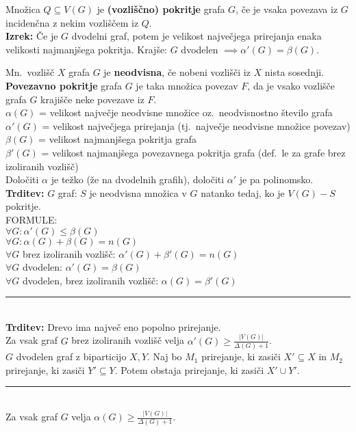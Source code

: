\documentclass[a4paper,10pt]{article}
\theoremstyle{definition}
\let\oldtextbf\textbf
\renewcommand{\textbf}[1]{\oldtextbf{\boldmath #1}}
\newcommand{\rlsep}{\rule{0.5 \textwidth}{.1pt}}
\begin{document}
Množica $Q \subseteq V(G)$ je \textbf{(vozliščno) pokritje} grafa $G$, če je vsaka povezava iz $G$ incidenčna z nekim vozliščem iz $Q$.\\
\textbf{Izrek:} Če je $G$ dvodelni graf, potem je velikost največjega prirejanja enaka velikosti najmanjšega pokritja. Krajše: $G$ dvodelen $\implies \alpha'(G) = \beta(G)$.

Mn.\ vozlišč $X$ grafa $G$ je \textbf{neodvisna}, če nobeni vozlišči iz $X$ nista sosednji.\\
\textbf{Povezavno pokritje} grafa $G$ je taka množica povezav $F$, da je vsako vozlišče grafa $G$ krajišče neke povezave iz $F$.\\
\textbf{$\alpha(G)$} = velikost največje neodvisne množice oz.\ neodvisnostno število grafa\\
\textbf{$\alpha'(G)$} = velikost največjega prirejanja (tj.\ največje neodvisne množice povezav)\\
\textbf{$\beta(G)$} = velikost najmanjšega pokritja grafa\\
\textbf{$\beta'(G)$} = velikost najmanjšega povezavnega pokritja grafa (def.\ le za grafe brez izoliranih vozlišč)\\
Določiti $\alpha$ je težko (že na dvodelnih grafih), določiti $\alpha'$ je pa polinomsko.\\
\textbf{Trditev:} $G$ graf: $S$ je neodvisna množica v $G$ natanko tedaj, ko je $V(G) - S$ pokritje.\\
FORMULE:\\
$\forall G\colon \alpha'(G) \leq \beta(G)$\\
$\forall G\colon \alpha(G) + \beta(G) = n(G)$\\
$\forall G$ brez izoliranih vozlišč: $\alpha'(G) + \beta'(G) = n(G)$\\
$\forall G$ dvodelen: $\alpha'(G) = \beta(G)$\\
$\forall G$ dvodelen, brez izoliranih vozlišč: $\alpha(G) = \beta'(G)$\\
\rlsep\\
\textbf{Trditev:} Drevo ima največ eno popolno prirejanje.\\
Za vsak graf $G$ brez izoliranih vozlišč velja $\alpha'(G) \geq \frac{|V(G)|}{\Delta(G) + 1}$.\\
$G$ dvodelen graf z biparticijo $X, Y$. Naj bo $M_1$ prirejanje, ki zasiči $X' \subseteq X$ in $M_2$ prirejanje, ki zasiči $Y' \subseteq Y$. Potem obstaja prirejanje, ki zasiči $X' \cup Y'$.\\
\rlsep\\
Za vsak graf $G$ velja $\alpha(G) \geq \frac{|V(G)|}{\Delta(G) + 1}$.
\end{document}
